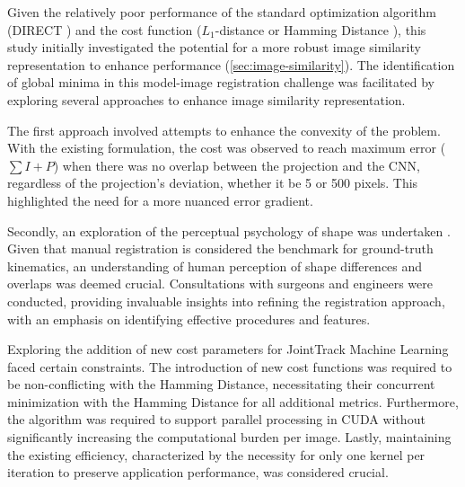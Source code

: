 Given the relatively poor performance of the standard optimization algorithm (DIRECT \cite{jonesLipschitzianOptimizationLipschitz1993,floodAutomatedRegistration3D2018}) and the cost function ($L_{1}$-distance or Hamming Distance \cite{floodAutomatedRegistration3D2018}), this study initially investigated the potential for a more robust image similarity representation to enhance performance (\cref{sec:image-similarity}).
The identification of global minima in this model-image registration challenge was facilitated by exploring several approaches to enhance image similarity representation.

The first approach involved attempts to enhance the convexity of the problem.
With the existing formulation, the cost was observed to reach maximum error ($\sum I + P$) when there was no overlap between the projection and the CNN, regardless of the projection's deviation, whether it be 5 or 500 pixels.
This highlighted the need for a more nuanced error gradient.

Secondly, an exploration of the perceptual psychology of shape was undertaken \cite{attneaveInformationalAspectsVisual1954,attneaveQuantitativeStudyShape1956}.
Given that manual registration is considered the benchmark for ground-truth kinematics, an understanding of human perception of shape differences and overlaps was deemed crucial.
Consultations with surgeons and engineers were conducted, providing invaluable insights into refining the registration approach, with an emphasis on identifying effective procedures and features.

Exploring the addition of new cost parameters for JointTrack Machine Learning faced certain constraints.
The introduction of new cost functions was required to be non-conflicting with the Hamming Distance, necessitating their concurrent minimization with the Hamming Distance for all additional metrics.
Furthermore, the algorithm was required to support parallel processing in CUDA without significantly increasing the computational burden per image.
Lastly, maintaining the existing efficiency, characterized by the necessity for only one kernel per iteration to preserve application performance, was considered crucial.




